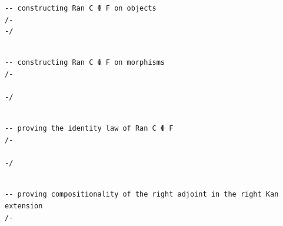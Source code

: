 \documentclass{book}
\theoremstyle{definition}
\newcounter{lcounter}
\begin{document}
{{\begin{center}
\begin{tcolorbox}[width=5in,colback={white},title={\begin{center}\texttt{Lean \thelcounter} \addtocounter{lcounter}{1}  \end{center}},colbacktitle=Blue,coltitle=black]
\begin{verbatim}
-- constructing Ran C Φ F on objects
/-
-/

\end{verbatim}
\end{tcolorbox}
\end{center}


\begin{center}
\begin{tcolorbox}[width=5in,colback={white},title={\begin{center}\texttt{Lean \thelcounter} \addtocounter{lcounter}{1}  \end{center}},colbacktitle=Blue,coltitle=black]
\begin{verbatim}

-- constructing Ran C Φ F on morphisms
/-

-/

\end{verbatim}
\end{tcolorbox}
\end{center}


\begin{center}
\begin{tcolorbox}[width=5in,colback={white},title={\begin{center}\texttt{Lean \thelcounter} \addtocounter{lcounter}{1}  \end{center}},colbacktitle=Blue,coltitle=black]
\begin{verbatim}

-- proving the identity law of Ran C Φ F
/-

-/

\end{verbatim}
\end{tcolorbox}
\end{center}


\begin{center}
\begin{tcolorbox}[width=5in,colback={white},title={\begin{center}\texttt{Lean \thelcounter} \addtocounter{lcounter}{1}  \end{center}},colbacktitle=Blue,coltitle=black]
\begin{verbatim}

-- proving compositionality of the right adjoint in the right Kan extension
/-


\end{verbatim}
\end{tcolorbox}
\end{center}}}
\end{document}
